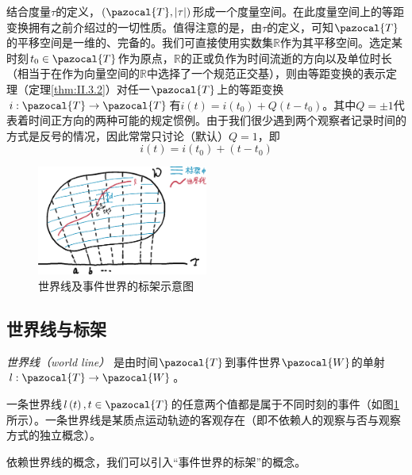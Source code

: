 \documentclass[main.tex]{subfiles}
\begin{document}
结合度量$\tau$的定义，$\left(\pazocal{T},\left|\tau\right|\right)$形成一个度量空间。在此度量空间上的等距变换拥有之前介绍过的一切性质。值得注意的是，由$\tau$的定义，可知$\pazocal{T}$的平移空间是一维的、完备的。我们可直接使用实数集$\mathbb{R}$作为其平移空间。选定某时刻$t_0\in\pazocal{T}$作为原点，$\mathbb{R}$的正或负作为时间流逝的方向以及单位时长（相当于在作为向量空间的$\mathbb{R}$中选择了一个规范正交基），则由等距变换的表示定理（定理\ref{thm:II.3.2}）对任一$\pazocal{T}$上的等距变换$i:\pazocal{T}\rightarrow\pazocal{T}$有$i\left(t\right)=i\left(t_0\right)+ Q\left(t-t_0\right)$。其中$Q=\pm 1$代表着时间正方向的两种可能的规定惯例。由于我们很少遇到两个观察者记录时间的方式是反号的情况，因此常常只讨论（默认）$Q=1$，即
\[
    i\left(t\right)=i\left(t_0\right)+\left(t-t_0\right)
\]

\begin{figure}[h]
    \centering
    \includegraphics[width=0.5\textwidth]{images/III.1.3.eps}
    \caption{世界线及事件世界的标架示意图}
    \label{fig:III.1.3}
\end{figure}

\subsection{世界线与标架}

\emph{世界线（world line）} 是由时间$\pazocal{T}$到事件世界$\pazocal{W}$的单射$l:\pazocal{T}\rightarrow\pazocal{W}$。


一条世界线$l\left(t\right),t\in\pazocal{T}$的任意两个值都是属于不同时刻的事件（如图\ref{fig:III.1.3}所示）。一条世界线是某质点运动轨迹的客观存在（即不依赖人的观察与否与观察方式的独立概念）。

依赖世界线的概念，我们可以引入“事件世界的标架”的概念。
\end{document}
